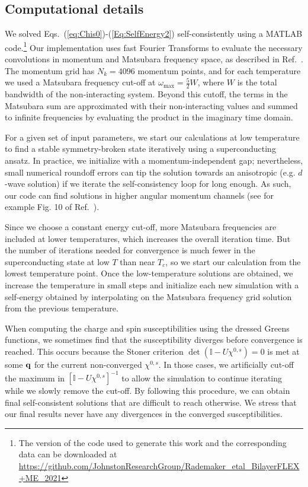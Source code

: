 \documentclass[%
 reprint,
 superscriptaddress,
nofootinbib,
nobibnotes,
 amsmath,amssymb,
 aps,
 prb,
 dvipsnames, 
 floatfix
]{revtex4-2}
\begin{document}
\subsection{Computational details}\label{Appendix:ComputationalDetails}
We solved Eqs.~(\ref{eq:Chis0})-(\ref{Eq:SelfEnergy2}) self-consistently using a \mbox{MATLAB} code.\footnote{The version of the code used to generate this work and the 
corresponding data can be downloaded at  \url{https://github.com/JohnstonResearchGroup/Rademaker_etal_BilayerFLEX+ME_2021}} 
Our implementation uses fast Fourier Transforms to evaluate the necessary convolutions in momentum and Matsubara frequency space, as described in Ref.~\cite{DeePRB2019}. The momentum grid has $N_k = 4096$ momentum points, and for each temperature we used a Matsubara frequency cut-off at $\omega_{\mathrm{max}} = \tfrac{5}{2}W$, where $W$ is the total bandwidth of the non-interacting system. Beyond this cutoff, the terms in the Matsubara sum are approximated with their non-interacting values and summed to infinite frequencies by evaluating the product in the imaginary time domain.

For a given set of input parameters, we start our calculations at low temperature to find a stable symmetry-broken state iteratively using a superconducting ansatz. In practice, we initialize with a momentum-independent gap; nevertheless, small numerical roundoff errors can tip the solution towards an anisotropic (e.g. $d$-wave solution) if we iterate the self-consistency loop for long enough. As such, our code can find solutions in higher angular momentum channels (see for example Fig. 10 of Ref.~\cite{WangSUST}). 

Since we choose a constant energy cut-off, more Matsubara frequencies are included at lower temperatures, which increases the overall iteration time. But the number of iterations needed for convergence is much fewer in the superconducting state at low $T$ than near $T_c$, so we start our calculation from the lowest temperature point. Once the low-temperature solutions are obtained, we increase the temperature in small steps and initialize each new simulation with a self-energy obtained by interpolating on the Matsubara frequency grid solution from the previous temperature. 

When computing the charge and spin susceptibilities using the dressed Greens functions, we sometimes find that the susceptibility diverges before convergence is reached. This occurs because the Stoner criterion $\det \left(\mathbb{I}-U\chi^{0,s} \right)=0$ is met at some ${\bf q}$ for the current non-converged $\chi^{0,s}$. In those cases, we artificially cut-off the maximum in $[\mathbb{I}-U\chi^{0,s}]^{-1}$ to allow the simulation to continue iterating while we slowly remove the cut-off. By following this procedure, we can obtain final self-consistent solutions that are difficult to reach otherwise. We stress that our final results never have any divergences in the converged susceptibilities. 
\end{document}
